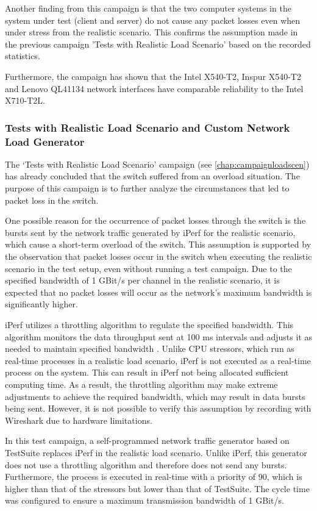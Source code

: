 Another finding from this campaign is that the two computer systems in the system under test (client and server) do not cause any packet losses even when under stress from the realistic scenario. This confirms the assumption made in the previous campaign 'Tests with Realistic Load Scenario' based on the recorded statistics.

Furthermore, the campaign has shown that the Intel X540-T2, Inspur X540-T2 and Lenovo QL41134 network interfaces have comparable reliability to the Intel X710-T2L.

\subsubsection{Tests with Realistic Load Scenario and Custom Network Load Generator}
The `Tests with Realistic Load Scenario' campaign (see \ref{chap:campaignloadscen}) has already concluded that the switch suffered from an overload situation. The purpose of this campaign is to further analyze the circumstances that led to packet loss in the switch.

One possible reason for the occurrence of packet losses through the switch is the bursts sent by the network traffic generated by iPerf for the realistic scenario, which cause a short-term overload of the switch. This assumption is supported by the observation that packet losses occur in the switch when executing the realistic scenario in the test setup, even without running a test campaign. Due to the specified bandwidth of 1 GBit/s per channel in the realistic scenario, it is expected that no packet losses will occur as the network's maximum bandwidth is significantly higher.

iPerf utilizes a throttling algorithm to regulate the specified bandwidth. This algorithm monitors the data throughput sent at 100 ms intervals and adjusts it as needed to maintain specified bandwidth \cite{reli03}. Unlike CPU stressors, which run as real-time processes in a realistic load scenario, iPerf is not executed as a real-time process on the system. This can result in iPerf not being allocated sufficient computing time. As a result, the throttling algorithm may make extreme adjustments to achieve the required bandwidth, which may result in data bursts being sent. However, it is not possible to verify this assumption by recording with Wireshark due to hardware limitations.

In this test campaign, a self-programmed network traffic generator based on TestSuite replaces iPerf in the realistic load scenario. Unlike iPerf, this generator does not use a throttling algorithm and therefore does not send any bursts. Furthermore, the process is executed in real-time with a priority of 90, which is higher than that of the stressors but lower than that of TestSuite. The cycle time was configured to ensure a maximum transmission bandwidth of 1 GBit/s.

